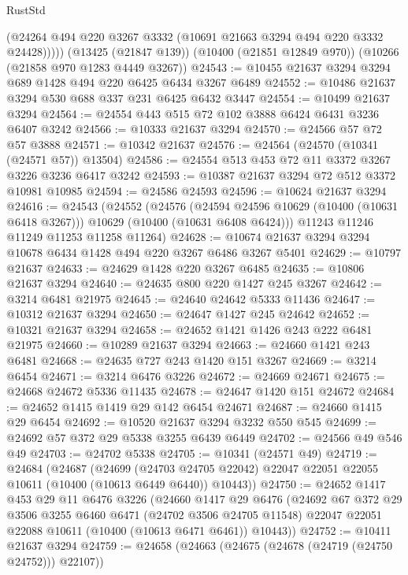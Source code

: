 \begin{lexlean}{RustStd}
\begin{coremodule}
          (@24264 @494 @220 @3267 @3332 (@10691 @21663 @3294 @494 @220 @3332 @24428)))))
    (@13425 (@21847 @139))
    (@10400 (@21851 @12849 @970))
    (@10266 (@21858 @970 @1283 @4449 @3267))
@24543 := @10455 @21637 @3294 @3294 @689 @1428 @494 @220 @6425 @6434 @3267 @6489
@24552 := @10486 @21637 @3294 @530 @688 @337 @231 @6425 @6432 @3447
@24554 := @10499 @21637 @3294
@24564 := @24554 @443 @515 @72 @102 @3888 @6424 @6431 @3236 @6407 @3242
@24566 := @10333 @21637 @3294
@24570 := @24566 @57 @72 @57 @3888
@24571 := @10342 @21637
@24576 := @24564 (@24570 (@10341 (@24571 @57)) @13504)
@24586 := @24554 @513 @453 @72 @11 @3372 @3267 @3226 @3236 @6417 @3242
@24593 := @10387 @21637 @3294 @72 @512 @3372 @10981 @10985
@24594 := @24586 @24593
@24596 := @10624 @21637 @3294
@24616 := @24543
    (@24552
      (@24576
        (@24594 @24596 @10629 (@10400 (@10631 @6418 @3267)))
        @10629
        (@10400 (@10631 @6408 @6424)))
      @11243
      @11246
      @11249
      @11253
      @11258
      @11264)
@24628 := @10674 @21637 @3294 @3294 @10678 @6434 @1428 @494 @220 @3267 @6486 @3267 @5401
@24629 := @10797 @21637
@24633 := @24629 @1428 @220 @3267 @6485
@24635 := @10806 @21637 @3294
@24640 := @24635 @800 @220 @1427 @245 @3267
@24642 := @3214 @6481 @21975
@24645 := @24640 @24642 @5333 @11436
@24647 := @10312 @21637 @3294
@24650 := @24647 @1427 @245 @24642
@24652 := @10321 @21637 @3294
@24658 := @24652 @1421 @1426 @243 @222 @6481 @21975
@24660 := @10289 @21637 @3294
@24663 := @24660 @1421 @243 @6481
@24668 := @24635 @727 @243 @1420 @151 @3267
@24669 := @3214 @6454
@24671 := @3214 @6476 @3226
@24672 := @24669 @24671
@24675 := @24668 @24672 @5336 @11435
@24678 := @24647 @1420 @151 @24672
@24684 := @24652 @1415 @1419 @29 @142 @6454 @24671
@24687 := @24660 @1415 @29 @6454
@24692 := @10520 @21637 @3294 @3232 @550 @545
@24699 := @24692 @57 @372 @29 @5338 @3255 @6439 @6449
@24702 := @24566 @49 @546 @49
@24703 := @24702 @5338
@24705 := @10341 (@24571 @49)
@24719 := @24684
    (@24687
      (@24699
        (@24703 @24705 @22042)
        @22047
        @22051
        @22055
        @10611
        (@10400 (@10613 @6449 @6440))
        @10443))
@24750 := @24652
    @1417
    @453
    @29
    @11
    @6476
    @3226
    (@24660
      @1417
      @29
      @6476
      (@24692
        @67
        @372
        @29
        @3506
        @3255
        @6460
        @6471
        (@24702 @3506 @24705 @11548)
        @22047
        @22051
        @22088
        @10611
        (@10400 (@10613 @6471 @6461))
        @10443))
@24752 := @10411 @21637 @3294
@24759 := @24658 (@24663 (@24675 (@24678 (@24719 (@24750 @24752))) @22107))

\end{coremodule}
\end{lexlean}
